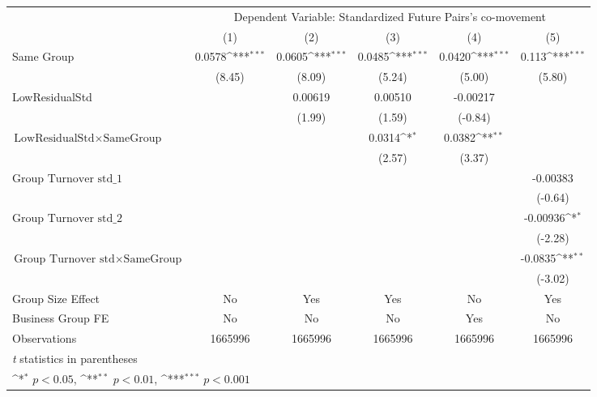 {
\def\sym#1{\ifmmode^{#1}\else\(^{#1}\)\fi}
\begin{tabular}{l*{5}{c}}
\hline\hline
                &\multicolumn{5}{c}{Dependent Variable: Standardized Future Pairs's co-movement}               \\\cmidrule(lr){2-6}
                &\multicolumn{1}{c}{(1)}         &\multicolumn{1}{c}{(2)}         &\multicolumn{1}{c}{(3)}         &\multicolumn{1}{c}{(4)}         &\multicolumn{1}{c}{(5)}         \\
\hline
Same Group      &   0.0578\sym{***}&   0.0605\sym{***}&   0.0485\sym{***}&   0.0420\sym{***}&    0.113\sym{***}\\
                &   (8.45)         &   (8.09)         &   (5.24)         &   (5.00)         &   (5.80)         \\
[1em]
LowResidualStd  &                  &  0.00619         &  0.00510         & -0.00217         &                  \\
                &                  &   (1.99)         &   (1.59)         &  (-0.84)         &                  \\
[1em]
$ {\text{LowResidualStd} } \times {\text{SameGroup} }  $ &                  &                  &   0.0314\sym{*}  &   0.0382\sym{**} &                  \\
                &                  &                  &   (2.57)         &   (3.37)         &                  \\
[1em]
 $ {\text{Group Turnover std}\_1} $ &                  &                  &                  &                  & -0.00383         \\
                &                  &                  &                  &                  &  (-0.64)         \\
[1em]
 $ {\text{Group Turnover std}\_2} $ &                  &                  &                  &                  & -0.00936\sym{*}  \\
                &                  &                  &                  &                  &  (-2.28)         \\
[1em]
$ {\text{Group Turnover std} } \times {\text{SameGroup} }  $ &                  &                  &                  &                  &  -0.0835\sym{**} \\
                &                  &                  &                  &                  &  (-3.02)         \\
\hline
Group Size Effect&       No         &      Yes         &      Yes         &       No         &      Yes         \\
Business Group FE&       No         &       No         &       No         &      Yes         &       No         \\
Observations    &  1665996         &  1665996         &  1665996         &  1665996         &  1665996         \\
\hline\hline
\multicolumn{6}{l}{\footnotesize \textit{t} statistics in parentheses}\\
\multicolumn{6}{l}{\footnotesize \sym{*} \(p<0.05\), \sym{**} \(p<0.01\), \sym{***} \(p<0.001\)}\\
\end{tabular}
}
